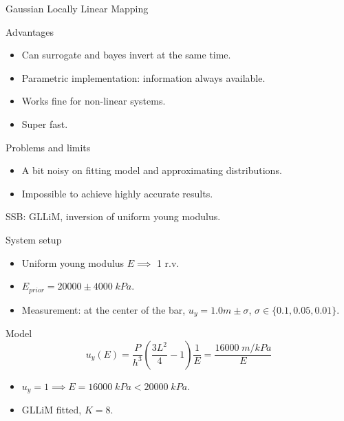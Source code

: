 	\begin{frame}{Gaussian Locally Linear Mapping}
	\begin{block}{Advantages}
	\begin{itemize}
	\item Can surrogate and bayes invert at the same time.
	\item Parametric implementation: information always available.
	\item Works fine for non-linear systems.
	\item Super fast.
	\end{itemize}
	\end{block}
	\begin{block}{Problems and limits}
	\begin{itemize}
	\item A bit noisy on fitting model and approximating distributions.
	\item Impossible to achieve highly accurate results.
	\end{itemize}
	\end{block}
	\end{frame}
	
	
	\begin{frame}{SSB: GLLiM, inversion of uniform young modulus.}
	\begin{block}{System setup}
	\begin{itemize}
	\item Uniform young modulus $E \implies$ 1 r.v.
	\item $E_{prior} = 20000 \pm 4000 \; \si{kPa}$.
	\item Measurement: at the center of the bar, $u_y = 1.0 \si{m} \pm \sigma$, $\sigma \in \{0.1, 0.05, 0.01\}$.
	\end{itemize}
	\end{block}
	\begin{block}{Model}
	\[ u_y(E) = \frac{P}{h^3} \left(\frac{3 L^2}{4} - 1\right) \frac{1}{E} = \frac{16000 \; \si{m/kPa} }{E}\]
	\begin{itemize}
	\item $u_y = 1 \implies E = 16000 \; \si{kPa} < 20000 \; \si{kPa}$.
	\item GLLiM fitted, $K = 8$.
	\end{itemize}
	\end{block}
	\end{frame}
	

